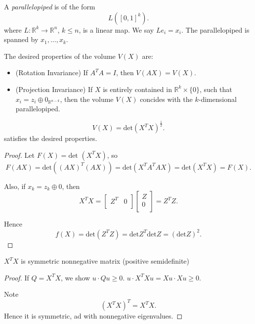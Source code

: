 
A \textit{parallelopiped} is of the form
\[
	L([0,1]^k)
.\] 
where $L: \mathbb{R}^k \to \mathbb{R}^n$, $k\le n$, is a linear map. We say $L e_i = x_i$. The parallelopiped is spanned by $x_1, \ldots, x_k$.

The desired properties of the volume $V(X)$ are:
\begin{itemize}
	\item (Rotation Invariance) If $A^T A = I$, then $V(AX) = V(X)$.
	\item (Projection Invariance) If $X$ is entirely contained in $\mathbb{R}^k \times \{0\}$, such that $x_i = z_i \oplus 0_{\mathbb{R}^{n-k}}$, then the volume $V(X)$ concides with the $k$-dimensional parallelopiped.
\end{itemize}

\begin{theorem}
	\[
		V(X) = \text{det}(X^T X)^{\frac{1}{2}}
	.\] 
	satisfies the desired properties.
\end{theorem}
\begin{proof}
	Let $F(X) = \text{det }(X^T X)$, so 
	\[
		F(AX) = \text{det}\left( (AX)^T (AX) \right) = \text{det}(X^T A^T A X) = \text{det} (X^T X) = F(X)
	.\] 

	Also, if $x_k = z_k \oplus 0$, then
	\[
		X^T X = 
	\begin{bmatrix}
		Z^T & 0 \\
	\end{bmatrix}
	\begin{bmatrix}
		Z \\
		0 \\
	\end{bmatrix}
	= Z^T Z
	.\] 

	Hence 
	\[
		f\left( X \right)  = \text{det}(Z^T Z) = \text{det}Z^T \text{det}Z =( \text{det}Z)^2
	.\] 

\end{proof}



\begin{lemma}
	$X^T X$ is symmetric nonnegative matrix (positive semidefinite)
\end{lemma}
\begin{proof}
	If $Q = X^T X$, we show $u \cdot Q u \ge 0$.
	$u \cdot X^T Xu = Xu \cdot Xu \ge 0$.

	Note
	\[
		(X^T X)^T = X^T X
	.\] 
	Hence it is symmetric, ad with nonnegative eigenvalues.
\end{proof}

